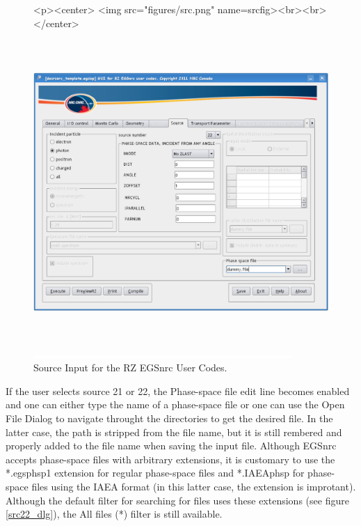 \documentclass[12pt,twoside]{article}   %
\begin{document}
\begin{figure}[htb]
\begin{htmlonly}
\begin{rawhtml}
<p><center>
<img src="figures/src.png" name=srcfig><br><br>
</center>
\end{rawhtml}
\end{htmlonly}
\begin{latexonly}
\begin{center}
\includegraphics[height=11.56cm]{figures/src}
\end{center}
\end{latexonly}
\begin{center}
\includegraphics[height=1mm]{figures/fake2}
\end{center}
\caption{Source Input for the RZ EGSnrc User Codes.}
\label{srcfig}
\end{figure}

If the user selects source 21 or 22,
the Phase-space file edit line becomes
enabled and one can either type the name
of a phase-space file or one can use the Open File Dialog
to navigate throught the directories to get the desired file.
In the latter case, the path is stripped from the file name,
but it is still rembered and properly added to the file name
when saving the input file. Although EGSnrc accepts phase-space files
with arbitrary extensions, it is customary to use the *.egsphsp1
extension for regular phase-space files and *.IAEAphsp for phase-space
files using the IAEA format (in this latter case, the extension is improtant).
Although the default filter for searching for files uses these
extensions (see figure \ref{src22_dlg}), the All files (*) filter is still available.
\end{document}
